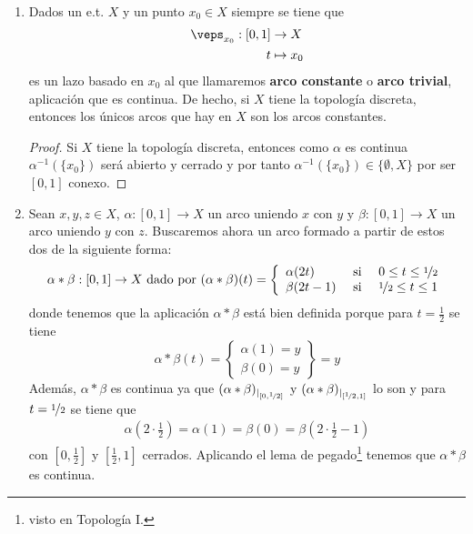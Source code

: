 \begin{ejemplo}\
    \begin{enumerate}
        \item Dados un e.t. $X$ y un punto $x_0\in X$ siempre se tiene que
        \begin{align*}
            \veps_{x_0}:[0,1]&\to X\\
            t &\mapsto x_0
        \end{align*}
        es un lazo basado en $x_0$ al que llamaremos \textbf{arco constante} o \textbf{arco trivial}, aplicación que es continua. De hecho, si $X$ tiene la topología discreta, entonces los únicos arcos que hay en $X$ son los arcos constantes.
        \begin{proof}
            Si $X$ tiene la topología discreta, entonces como $\alpha$ es continua $\alpha^{-1}(\{x_0\})$ será abierto y cerrado y por tanto $\alpha^{-1}(\{x_0\})\in\{\emptyset, X\}$ por ser $[0,1]$ conexo.
        \end{proof}


        \item Sean $x,y,z\in X$, $\alpha:[0,1]\to X$ un arco uniendo $x$ con $y$ y $\beta:[0,1]\to X$ un arco uniendo $y$ con $z$. Buscaremos ahora un arco formado a partir de estos dos de la siguiente forma:
        \begin{align*}
            \alpha\ast\beta : [0,1]\to X \text{ dado por } (\alpha\ast\beta)(t) = \left\{ 
                \begin{array}{l c c}
                    \alpha(2t) & \text{ si } & 0 \leq t \leq \nicefrac{1}{2} \\
                    \beta(2t-1) & \text{ si } & \nicefrac{1}{2}\leq t \leq 1
                \end{array}
            \right.
        \end{align*}
        donde tenemos que la aplicación $\alpha\ast\beta$ está bien definida porque para $t=\frac{1}{2}$ se tiene
        \begin{equation*}
            \alpha\ast\beta(t)=\left\{ \begin{array}{cc}
                \alpha(1)=y \\
                \beta(0)=y
            \end{array} \right\} =y
        \end{equation*}
        Además, $\alpha\ast\beta$ es continua ya que $(\alpha\ast\beta)_{|_{[0,\nicefrac{1}{2}]}}$ y $(\alpha\ast\beta)_{|_{[\nicefrac{1}{2},1]}}$ lo son y para $t=\nicefrac{1}{2}$ se tiene que
        \begin{gather*}
            \alpha \left(2 \cdot \frac{1}{2}\right) = \alpha(1) = \beta(0) = \beta\left(2\cdot \frac{1}{2} -1\right)
        \end{gather*}
        con $\left[0, \frac{1}{2}\right]$ y $\left[\frac{1}{2}, 1\right]$ cerrados. Aplicando el lema de pegado\footnote{visto en Topología I.} tenemos que $\alpha\ast \beta$ es continua.


\end{enumerate}
\end{ejemplo}
